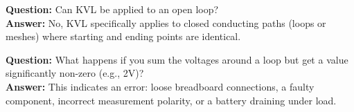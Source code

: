 \begin{vivaqa}
\textbf{Question:} Can KVL be applied to an open loop?\\[4pt]
\textbf{Answer:} No, KVL specifically applies to closed conducting paths (loops or meshes) where starting and ending points are identical.
\end{vivaqa}

\begin{vivaqa}
\textbf{Question:} What happens if you sum the voltages around a loop but get a value significantly non-zero (e.g., 2V)?\\[4pt]
\textbf{Answer:} This indicates an error: loose breadboard connections, a faulty component, incorrect measurement polarity, or a battery draining under load.
\end{vivaqa}
